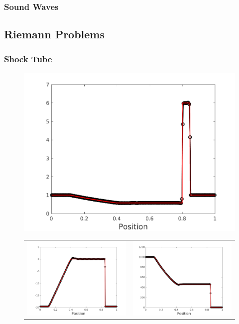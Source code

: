 \documentclass[10pt,preprint]{aastex}
\begin{document}
\subsubsection{Sound Waves}

\subsection{Riemann Problems}

\subsubsection{Shock Tube}

\begin{figure}[h]
  \begin{center}
     \includegraphics[width=.95\textwidth]{RiemannProblem_d5.png}
	\begin{tabular}{cc}
      \includegraphics[width=.475\textwidth]{RiemannProblem_v5.png} &
	  \includegraphics[width=.475\textwidth]{RiemannProblem_p5.png}

\end{tabular}
\end{center}
\end{figure}
\end{document}
